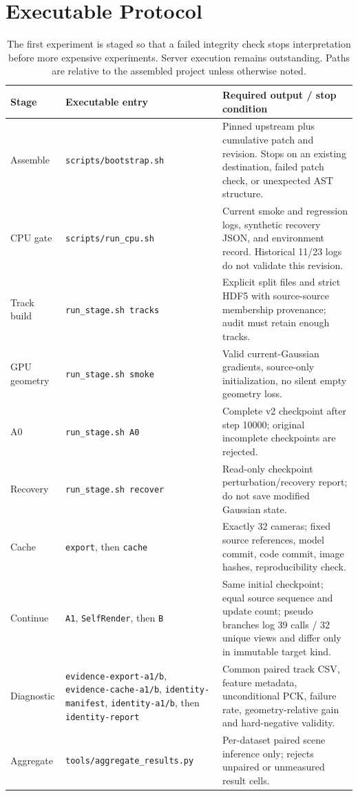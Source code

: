 \documentclass[10pt,twocolumn,letterpaper]{article}
\begin{document}
\section{Executable Protocol}
\begin{table}[t]
\centering\small
\begin{tabularx}{\textwidth}{p{}p{}X}
\toprule
Stage & Executable entry & Required output / stop condition\\
\midrule
Assemble & \texttt{scripts/bootstrap.sh} & Pinned upstream plus cumulative patch and revision. Stops on an existing destination, failed patch check, or unexpected AST structure.\\
CPU gate & \texttt{scripts/run\_cpu.sh} & Current smoke and regression logs, synthetic recovery JSON, and environment record. Historical 11/23 logs do not validate this revision.\\
Track build & \texttt{run\_stage.sh tracks} & Explicit split files and strict HDF5 with source-source membership provenance; audit must retain enough tracks.\\
GPU geometry & \texttt{run\_stage.sh smoke} & Valid current-Gaussian gradients, source-only initialization, no silent empty geometry loss.\\
A0 & \texttt{run\_stage.sh A0} & Complete v2 checkpoint after step 10000; original incomplete checkpoints are rejected.\\
Recovery & \texttt{run\_stage.sh recover} & Read-only checkpoint perturbation/recovery report; do not save modified Gaussian state.\\
Cache & \texttt{export}, then \texttt{cache} & Exactly 32 cameras; fixed source references, model commit, code commit, image hashes, reproducibility check.\\
Continue & \texttt{A1}, \texttt{SelfRender}, then \texttt{B} & Same initial checkpoint; equal source sequence and update count; pseudo branches log 39 calls / 32 unique views and differ only in immutable target kind.\\
Diagnostic & \texttt{evidence-export-a1/b}, \texttt{evidence-cache-a1/b}, \texttt{identity-manifest}, \texttt{identity-a1/b}, then \texttt{identity-report} & Common paired track CSV, feature metadata, unconditional PCK, failure rate, geometry-relative gain and hard-negative validity.\\
Aggregate & \texttt{tools/aggregate\_results.py} & Per-dataset paired scene inference only; rejects unpaired or unmeasured result cells.\\
\bottomrule
\end{tabularx}
\caption{The first experiment is staged so that a failed integrity check stops interpretation before more expensive experiments. Server execution remains outstanding. Paths are relative to the assembled project unless otherwise noted.}
\end{table}
\end{document}
